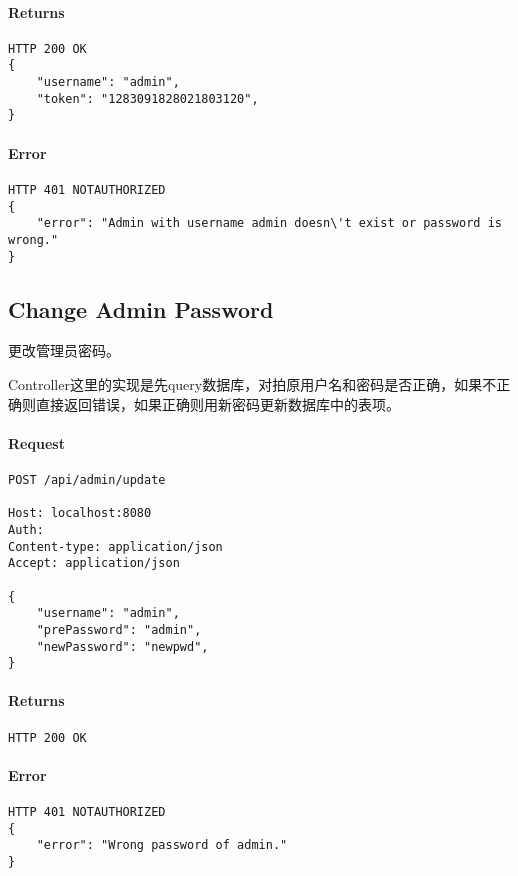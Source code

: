 \documentclass{article}
\begin{document}
\paragraph*{Returns}
\begin{lstlisting}
HTTP 200 OK
{
    "username": "admin",
    "token": "1283091828021803120",
}

\end{lstlisting}

\paragraph*{Error}
\begin{lstlisting}
HTTP 401 NOTAUTHORIZED
{
    "error": "Admin with username admin doesn\'t exist or password is wrong."
}
\end{lstlisting}

\subsection{Change Admin Password}
更改管理员密码。

Controller这里的实现是先query数据库，对拍原用户名和密码是否正确，如果不正确则直接返回错误，如果正确则用新密码更新数据库中的表项。

\paragraph*{Request}
\begin{lstlisting}
POST /api/admin/update

Host: localhost:8080
Auth:
Content-type: application/json
Accept: application/json

{
    "username": "admin",
    "prePassword": "admin",
    "newPassword": "newpwd",
}
\end{lstlisting}

\paragraph*{Returns}
\begin{lstlisting}
HTTP 200 OK

\end{lstlisting}

\paragraph*{Error}
\begin{lstlisting}
HTTP 401 NOTAUTHORIZED
{
    "error": "Wrong password of admin."
}
\end{lstlisting}
\end{document}
